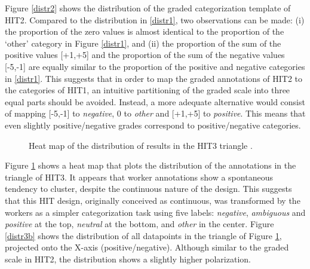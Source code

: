 \documentclass[11pt, a4paper,onecolumn]{article}
\begin{document}
Figure \ref{distr2} shows the distribution of the graded categorization template of HIT2. Compared to the distribution in \ref{distr1}, two observations can be made: (i) the proportion of the zero values is almost identical to the proportion of the `other' category in Figure \ref{distr1}, and (ii) the proportion of the sum of the positive values [+1,+5] and the proportion of the sum of the negative values [-5,-1] are equally similar to the proportion of the positive and negative categories in \ref{distr1}. This suggests that in order to map the graded annotations of HIT2 to the categories of HIT1, an intuitive partitioning of the graded scale into three equal parts should be avoided. Instead, a more adequate alternative would consist of mapping [-5,-1] to \textit{negative}, 0 to \textit{other} and [+1,+5] to \textit{positive}. This means that even slightly positive/negative grades correspond to positive/negative categories.



\begin{figure}[h]
  \begin{center}
	\caption{Heat map of the distribution of results in the HIT3 triangle .}
	\label{distr3}
  \end{center}
\end{figure}

Figure \ref{distr3} shows a heat map that plots the distribution of the annotations in the triangle of HIT3. It appears that worker annotations show a spontaneous tendency to cluster, despite the continuous nature of the design. This suggests that this HIT design, originally conceived as continuous, was transformed by the workers as a simpler categorization task using five labels: \textit{negative}, \textit{ambiguous} and \textit{positive} at the top, \textit{neutral} at the bottom, and \textit{other} in the center.
Figure \ref{distr3b} shows the distribution of all datapoints in the triangle of Figure \ref{distr3}, projected onto the X-axis (positive/negative). Although similar to the graded scale in HIT2, the distribution shows a slightly higher polarization.
\end{document}
